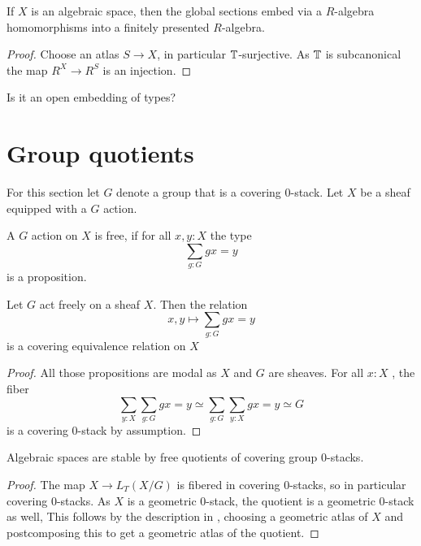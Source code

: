 \begin{lemma}
	If $X$ is an algebraic space, then the global sections embed via a $R$-algebra homomorphisms into a finitely presented $R$-algebra.
\end{lemma}
\begin{proof}
	Choose an atlas $S \to X$, in particular $\mathbb{T}$-surjective. As $\mathbb{T}$ is subcanonical the map $R^X \to R^S$ is an injection.
\end{proof}
\begin{question}
	Is it an open embedding of types?
\end{question}
\section{Group quotients}
For this section let $G$ denote a group that is a covering 0-stack. Let $X$ be a sheaf equipped with a $G$ action.
\begin{definition}
	A $G$ action on $X$ is free, if for all $x , y : X$ the type 
	\[
	\sum_{g: G} g x = y
	\]
	is a proposition. 
\end{definition}
\begin{lemma}
	Let $G$ act freely on a sheaf $X$. Then the relation
	\[
	x , y\mapsto \sum_{g : G} g x = y
	\]
	is a covering equivalence relation on $X$
\end{lemma}
\begin{proof}
	All those propositions are modal as $X$ and $G$ are sheaves. For all $x : X$ , the fiber
	\[
	\sum_{y : X} \sum_{g : G} g x = y \simeq \sum_{g : G} \sum_{y: X} g x = y \simeq G
	\]
	is a covering 0-stack by assumption.
\end{proof}
\begin{lemma}{\label{lemma:algSpacesStabFreeQuots}}
	Algebraic spaces are stable by free quotients of covering group 0-stacks.
\end{lemma}
\begin{proof}
	The map $ X \to L_T (X / G)$ is fibered in covering 0-stacks, so in particular covering $0$-stacks. As $X$ is a geometric $0$-stack, the quotient is a geometric $0$-stack as well, This follows by the description in \label{prop:nstack}, choosing a geometric atlas of $X$ and postcomposing this to get a geometric atlas of the quotient.
\end{proof}

